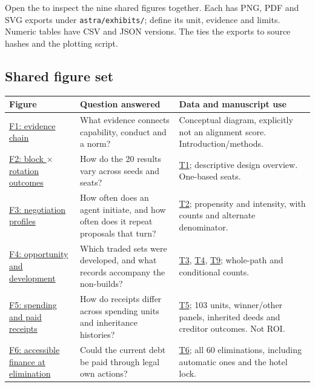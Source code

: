 Open the  to inspect the nine shared figures together. Each has PNG, PDF and SVG exports under \texttt{astra/exhibits/};  define its unit, evidence and limits. Numeric tables have CSV and JSON versions. The  ties the exports to source hashes and the plotting script.

\subsection*{Shared figure set}
\begingroup\small
\begin{longtable}{L{\dimexpr\linewidth/3-2\tabcolsep\relax}L{\dimexpr\linewidth/3-2\tabcolsep\relax}L{\dimexpr\linewidth/3-2\tabcolsep\relax}}
\toprule
\textbf{Figure} & \textbf{Question answered} & \textbf{Data and manuscript use} \\
\midrule
\endhead
\hyperref[fig:f01_evidence_chain]{F1: evidence chain} & What evidence connects capability, conduct and a norm? & Conceptual diagram, explicitly not an alignment score. Introduction/methods. \\
\hyperref[fig:f02_seed_rotation_winners]{F2: block \ensuremath{\times} rotation outcomes} & How do the 20 results vary across seeds and seats? & \hyperref[tab:t01_cohort]{T1}; descriptive design overview. One-based seats. \\
\hyperref[fig:f03_negotiation_profiles]{F3: negotiation profiles} & How often does an agent initiate, and how often does it repeat proposals that turn? & \hyperref[tab:t02_negotiation]{T2}; propensity and intensity, with counts and alternate denominator. \\
\hyperref[fig:f04_opportunity_and_deployment]{F4: opportunity and development} & Which traded sets were developed, and what records accompany the non-builds? & \hyperref[tab:t03_trade_groups]{T3}, \hyperref[tab:t04_bilateral_completion]{T4}, \hyperref[tab:t09_entry_nonbuild_records]{T9}; whole-path and conditional counts. \\
\hyperref[fig:f05_spending_and_receipts]{F5: spending and paid receipts} & How do receipts differ across spending units and inheritance histories? & \hyperref[tab:t05_spending_units]{T5}; 103 units, winner/other panels, inherited deeds and creditor outcomes. Not ROI. \\
\hyperref[fig:f06_elimination_financing]{F6: accessible finance at elimination} & Could the current debt be paid through legal own actions? & \hyperref[tab:t06_eliminations]{T6}; all 60 eliminations, including automatic ones and the hotel lock. \\

\end{longtable}
